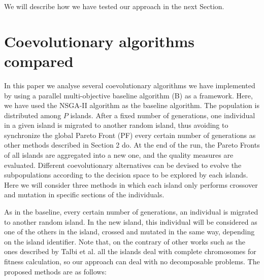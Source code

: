 \documentclass[Crown,sagev,times,doublespace]{sagej}
\begin{document}
We will describe how we have tested our approach in the next Section.




%
%

\section{Coevolutionary algorithms compared}
\label{sec:coevo}

In this paper we analyse several coevolutionary algorithms we have implemented by using a parallel multi-objective baseline algorithm (B) as a framework. Here, we have used the NSGA-II algorithm as the baseline algorithm. The population is distributed among $P$ islands. After a fixed number of generations, one individual in a given island is migrated to another random island, thus avoiding to synchronize the global Pareto Front (PF) every certain number of generations as other methods described in Section 2 do. At the end of the run, the Pareto Fronts of all islands are aggregated into a new one, and the quality measures are evaluated.
Different coevolutionary alternatives can be devised to evolve the subpopulations according to the decision space to be explored by each islands. Here we will consider three methods in which each island only performs crossover and mutation in specific sections of the individuals.



%

As in the baseline, every certain number of generations, an individual is migrated to another random island.  In the new island, this individual will be considered as one of the others in the island, crossed and mutated in the same way, depending on the island identifier. Note that, on the contrary of other works such as the ones described by Talbi et al. \citep{Talbi08Parallel} all the islands deal with complete chromosomes for fitness calculation, so our approach can deal with no decomposable problems. The proposed methods  are as follows:
\end{document}
